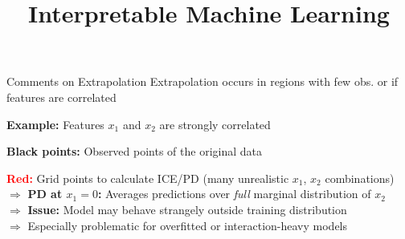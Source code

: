 \documentclass[10pt,compress,t,notes=noshow, xcolor=table]{beamer}
\title{Interpretable Machine Learning}
\begin{document}


\begin{framev}[align=top]{Comments on Extrapolation}
Extrapolation occurs in regions with few obs. or if features are correlated
\begin{itemizeM}
\item \textbf{Example:} Features $x_1$ and $x_2$ are strongly correlated
\item \textbf{Black points:} Observed points of the original data
\item \textbf{\textcolor{red}{Red:}} Grid points to calculate ICE/PD (many unrealistic $x_1$, $x_2$ combinations)\\ %
$\Rightarrow$ %
\textbf{PD at $x_1=0$:} Averages predictions over \textit{full} marginal distribution of $x_2$\\
$\Rightarrow$ \textbf{Issue:} Model may behave strangely outside training distribution\\
$\Rightarrow$ Especially problematic for overfitted or interaction-heavy models
\end{itemizeM}
%
%
%
%
\end{framev}
\end{document}
